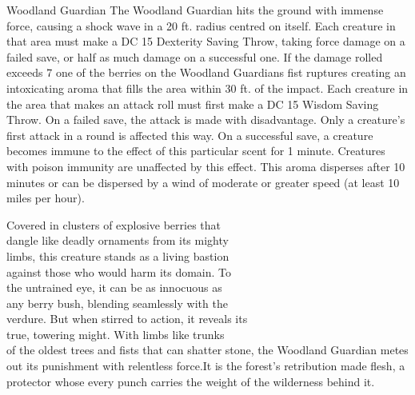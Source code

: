 \begin{DndMonster}[width=0.5\textwidth]{Woodland Guardian}
	The Woodland Guardian hits the ground with immense force, causing a shock wave in a 20 ft. radius centred on itself. Each creature in that area must make a DC 15 Dexterity Saving Throw, taking  force damage on a failed save, or half as much damage on a successful one. If the damage rolled exceeds 7 one of the berries on the Woodland Guardians fist ruptures creating an intoxicating aroma that fills the area within 30 ft. of the impact. Each creature in the area that makes an attack roll must first make a DC 15 Wisdom Saving Throw. On a failed save, the attack is made with disadvantage. Only a creature's first attack in a round is affected this way. On a successful save, a creature becomes immune to the effect of this particular scent for 1 minute. Creatures with poison immunity are unaffected by this effect. This aroma disperses after 10 minutes or can be dispersed by a wind of moderate or greater speed  (at least 10 miles per hour).
\end{DndMonster}

\noindent Covered in clusters of explosive berries that\\dangle like deadly ornaments from its mighty\\limbs, this creature stands as a living bastion\\against those who would harm its domain. To\\the untrained eye, it can be as innocuous as\\any berry bush, blending seamlessly with the\\verdure. But when stirred to action, it reveals its\\true, towering might. With limbs like trunks\\of the oldest trees and fists that can shatter stone, the Woodland Guardian metes out its punishment with relentless force.It is the forest's retribution made flesh, a protector whose every punch carries the weight of the wilderness behind it.


